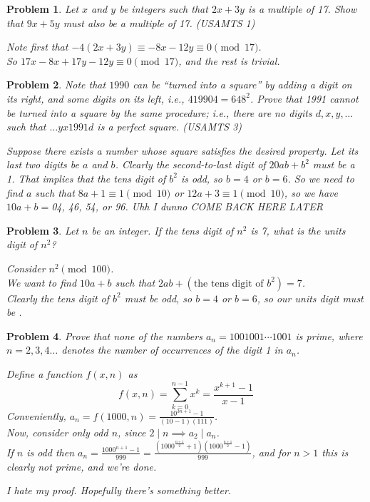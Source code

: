 \documentclass{scrartcl}
\newtheorem{a_problem}{Problem}
\begin{document}
\setcounter{a_problem}{386}
\begin{a_problem}
	Let $x$ and $y$ be integers such that $2x+3y$ is a multiple of 17. Show that $9x + 5y$ must also be a multiple of 17. (USAMTS 1)
	\begin{soln}
		Note first that $-4(2x + 3y) \equiv -8x - 12y \equiv 0 \pmod{17}$. \\
		So $17x - 8x + 17y - 12y \equiv 0 \pmod{17}$, and the rest is trivial.
	\end{soln}
\end{a_problem}

\begin{a_problem}
	Note that $1990$ can be ``turned into a square'' by adding a digit on its right, and some digits on its left, i.e., $419904=648^2$. Prove that 1991 cannot be turned into a square by the same procedure; i.e., there are no digits $d,x,y, \dots$ such that $\dots yx1991d$ is a perfect square. (USAMTS 3)
	\begin{soln}
		Suppose there exists a number whose square satisfies the desired property. Let its last two digits be $a$ and $b$.
		Clearly the second-to-last digit of $20ab + b^2$ must be a 1. That implies that the tens digit of $b^2$ is odd, so $b=4$ or $b=6$. So we need to find $a$ such that $8a + 1 \equiv 1 \pmod{10}$ or $12a + 3 \equiv 1 \pmod{10}$, so we have $10a+b = $04, 46, 54, or 96.
		Uhh I dunno COME BACK HERE LATER
	\end{soln}
\end{a_problem}

\setcounter{a_problem}{392}
\begin{a_problem}
	Let $n$ be an integer. If the tens digit of $n^2$ is 7, what is the units digit of $n^2$?
	\begin{soln}
		Consider $n^2 \pmod{100}$. \\
		We want to find $10a+b$ such that $2ab + (\text{the tens digit of $b^2$}) = 7$. \\
		Clearly the tens digit of $b^2$ must be odd, so $b=4$ or $b=6$, so our units digit must be .
	\end{soln}
\end{a_problem}

\begin{a_problem}
	Prove that none of the numbers $a_n = 1001001\cdots1001$ is prime, where $n=2,3,4\dots$ denotes the number of occurrences of the digit 1 in $a_n$.
	\begin{soln}
		Define a function $f(x,n)$ as
		\[f(x,n) = \sum_{k=0}^{n-1}x^k = \frac{x^{k+1}-1}{x - 1} \]
			Conveniently, $a_n = f(1000,n) = \frac{10^{3n+1} - 1}{(10 - 1)(111)}$. \\
		Now, consider only odd $n$, since $2 \mid n \implies a_2 \mid a_n$. \\
		If $n$ is odd then $a_n = \frac{1000^{n+1}-1}{999} = \frac{(1000^{\frac{n+1}{2}} + 1)(1000^{\frac{n+1}2} - 1)}{999}$, and for $n>1$ this is clearly not prime, and we're done.
	\end{soln}
	\begin{remark*}
		I hate my proof. Hopefully there's something better.
	\end{remark*}
\end{a_problem}
\end{document}
